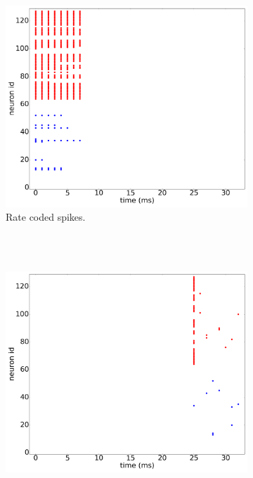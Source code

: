 \documentclass[conference]{IEEEtran}
\begin{document}
\begin{figure}[hbt]
  \captionsetup[subfigure]{justification=centering}
  
  \centering
  \begin{subfigure}[b]{0.32\textwidth}
    \includegraphics[width=\textwidth]{rate_coded_-8x8-_cycle_0}
    \caption{Rate coded spikes.\\~ }
    \label{fig:rate_spikes}
  \end{subfigure}~
  \begin{subfigure}[b]{0.32\textwidth}
    \includegraphics[width=\textwidth]{time_coded_-8x8-_cycle_0}

\end{subfigure}
\end{figure}
\end{document}
